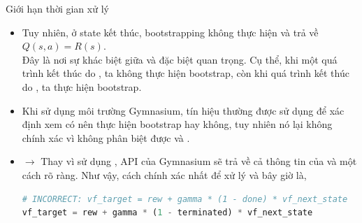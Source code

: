 \documentclass[10pt,aspectratio=169]{beamer}
\begin{document}
\begin{frame}[fragile]{Giới hạn thời gian xử lý}{\subsecname}
\begin{itemize}
\setlength\itemsep{8pt}
\item Tuy nhiên, ở state kết thúc, bootstrapping không thực hiện và trả về $ Q(s,a) = R(s) $.\\
\vspace{4pt}
Đây là nơi sự khác biệt giữa  và  đặc biệt quan trọng. Cụ thể, khi một quá trình kết thúc do , ta không thực hiện bootstrap, còn khi quá trình kết thúc do , ta thực hiện bootstrap.
\item Khi sử dụng môi trường Gymnasium, tín hiệu  thường được sử dụng để xác định xem có nên thực hiện bootstrap hay không, tuy nhiên nó lại không chính xác vì không phân biệt được  và .
\item[] $ \longrightarrow $ Thay vì sử dụng , API  của Gymnasium sẽ trả về cả thông tin của  và  một cách rõ ràng. Như vậy, cách chính xác nhất để xử lý  và  bây giờ là,\\
\scriptsize
\begin{lstlisting}[language=Python]
# INCORRECT: vf_target = rew + gamma * (1 - done) * vf_next_state
vf_target = rew + gamma * (1 - terminated) * vf_next_state
\end{lstlisting}
\end{itemize}
\end{frame}
\end{document}

